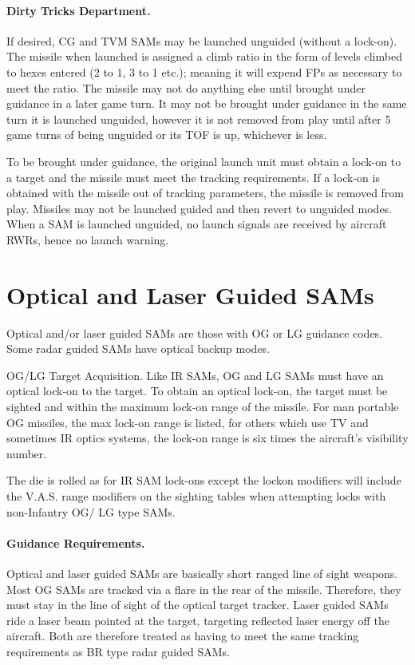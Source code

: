\paragraph{Dirty Tricks Department.} If desired, CG and TVM SAMs may be launched unguided (without a lock-on). The missile when launched is assigned a climb ratio in the form of levels climbed to hexes entered (2 to 1, 3 to 1 etc.); meaning it will expend FPs as necessary to meet the ratio. The missile may not do anything else until brought under guidance in a later game turn. It may not be brought under guidance in the same turn it is launched unguided, however it is not removed from play until after 5 game turns of being unguided or its TOF is up,  whichever is less.

To be brought under guidance, the original launch unit must obtain a lock-on to a target and the missile must meet the tracking requirements. If a lock-on is obtained with the missile out of tracking parameters, the missile is removed from play. Missiles may not be launched guided and then revert to unguided modes. When a SAM is launched unguided, no launch signals are received by aircraft RWRs, hence no launch warning.

\section{Optical and Laser Guided SAMs}

Optical and/or laser guided SAMs are those with OG or LG guidance codes. Some radar guided SAMs have optical back­up modes.

OG/LG Target Acquisition. Like IR SAMs, OG and LG SAMs must have an optical lock-on to the target. To obtain an optical lock-on, the target must be sighted and within the maximum lock-on range of the missile. For man portable OG missiles, the max lock-on range is listed, for others which use TV and sometimes IR optics systems, the lock-on range is six times the aircraft's visibility number.

The die is rolled as for IR SAM lock-ons except the lock­on modifiers will include the V.A.S. range modifiers on the sighting tables when attempting locks with non-Infantry OG/ LG type SAMs.

\paragraph{Guidance Requirements.} Optical and laser guided SAMs are basically short ranged line of sight weapons. Most OG SAMs are tracked via a flare in the rear of the missile. Therefore, they must stay in the line of sight of the optical target tracker. Laser guided SAMs ride a laser beam pointed at the target, targeting reflected laser energy off the aircraft. Both are therefore treated as having to meet the same tracking requirements as BR type radar guided SAMs.

